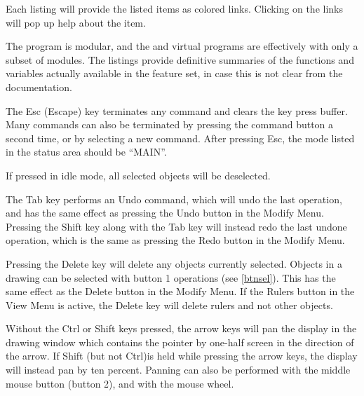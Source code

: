 Each listing will provide the listed items as colored links.  Clicking
on the links will pop up help about the item.

The {\Xic} program is modular, and the {\XicII} and {\Xiv} virtual
programs are effectively {\Xic} with only a subset of modules.  The
listings provide definitive summaries of the functions and variables
actually available in the feature set, in case this is not clear from
the documentation.

The {\kb Esc} (Escape) key terminates any command and clears the key
press buffer.  Many commands can also be terminated by pressing the
command button a second time, or by selecting a new command.  After
pressing {\kb Esc}, the {\et mode} listed in the status area should be
``{\vt MAIN}''.

If pressed in idle mode, all selected objects will be deselected.

The {\kb Tab} key performs an {\cb Undo} command, which will undo the
last operation, and has the same effect as pressing the {\cb Undo}
button in the {\cb Modify Menu}.  Pressing the {\kb Shift} key along
with the {\kb Tab} key will instead redo the last undone operation,
which is the same as pressing the {\cb Redo} button in the {\cb Modify
Menu}. 

Pressing the {\kb Delete} key will delete any objects currently
selected.  Objects in a drawing can be selected with button 1
operations (see \ref{btnsel}).  This has the same effect as the {\cb
Delete} button in the {\cb Modify Menu}.  If the {\cb Rulers} button in
the {\cb View Menu} is active, the {\kb Delete} key will delete rulers
and not other objects.

Without the {\kb Ctrl} or {\kb Shift} keys pressed, the arrow keys
will pan the display in the drawing window which contains the pointer
by one-half screen in the direction of the arrow.  If {\kb Shift} (but
not {\kb Ctrl})is held while pressing the arrow keys, the display will
instead pan by ten percent.  Panning can also be performed with the
middle mouse button (button 2), and with the mouse wheel. 

